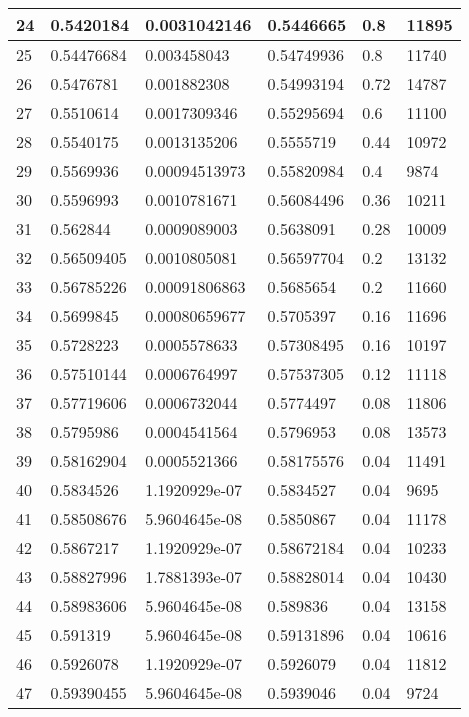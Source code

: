\begin{longtable}{|l|l|l|l|l|l|}
24 & 0.5420184 & 0.0031042146 & 0.5446665 & 0.8 & 11895 \\ \hline 
25 & 0.54476684 & 0.003458043 & 0.54749936 & 0.8 & 11740 \\ \hline 
26 & 0.5476781 & 0.001882308 & 0.54993194 & 0.72 & 14787 \\ \hline 
27 & 0.5510614 & 0.0017309346 & 0.55295694 & 0.6 & 11100 \\ \hline 
28 & 0.5540175 & 0.0013135206 & 0.5555719 & 0.44 & 10972 \\ \hline 
29 & 0.5569936 & 0.00094513973 & 0.55820984 & 0.4 & 9874 \\ \hline 
30 & 0.5596993 & 0.0010781671 & 0.56084496 & 0.36 & 10211 \\ \hline 
31 & 0.562844 & 0.0009089003 & 0.5638091 & 0.28 & 10009 \\ \hline 
32 & 0.56509405 & 0.0010805081 & 0.56597704 & 0.2 & 13132 \\ \hline 
33 & 0.56785226 & 0.00091806863 & 0.5685654 & 0.2 & 11660 \\ \hline 
34 & 0.5699845 & 0.00080659677 & 0.5705397 & 0.16 & 11696 \\ \hline 
35 & 0.5728223 & 0.0005578633 & 0.57308495 & 0.16 & 10197 \\ \hline 
36 & 0.57510144 & 0.0006764997 & 0.57537305 & 0.12 & 11118 \\ \hline 
37 & 0.57719606 & 0.0006732044 & 0.5774497 & 0.08 & 11806 \\ \hline 
38 & 0.5795986 & 0.0004541564 & 0.5796953 & 0.08 & 13573 \\ \hline 
39 & 0.58162904 & 0.0005521366 & 0.58175576 & 0.04 & 11491 \\ \hline 
40 & 0.5834526 & 1.1920929e-07 & 0.5834527 & 0.04 & 9695 \\ \hline 
41 & 0.58508676 & 5.9604645e-08 & 0.5850867 & 0.04 & 11178 \\ \hline 
42 & 0.5867217 & 1.1920929e-07 & 0.58672184 & 0.04 & 10233 \\ \hline 
43 & 0.58827996 & 1.7881393e-07 & 0.58828014 & 0.04 & 10430 \\ \hline 
44 & 0.58983606 & 5.9604645e-08 & 0.589836 & 0.04 & 13158 \\ \hline 
45 & 0.591319 & 5.9604645e-08 & 0.59131896 & 0.04 & 10616 \\ \hline 
46 & 0.5926078 & 1.1920929e-07 & 0.5926079 & 0.04 & 11812 \\ \hline 
47 & 0.59390455 & 5.9604645e-08 & 0.5939046 & 0.04 & 9724 \\ \hline 

\end{longtable}
